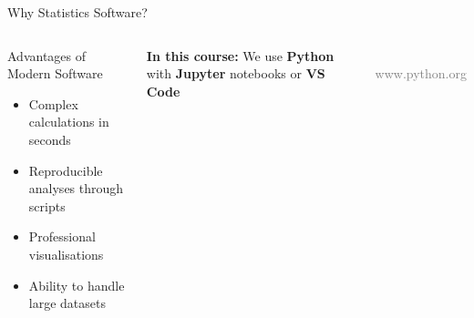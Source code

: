 \documentclass[aspectratio=169,11pt]{beamer}
\begin{document}
\begin{frame}{Why Statistics Software?}
  \begin{columns}[c]
    \begin{block}{Advantages of Modern Software}
      \begin{itemize}
        \item Complex calculations in seconds
        \item Reproducible analyses through scripts
        \item Professional visualisations
        \item Ability to handle large datasets
      \end{itemize}
    \end{block}
    \vspace{0.8em}
    \textbf{In this course:} We use \textbf{Python} with
    \textbf{Jupyter} notebooks or \textbf{VS Code}

    \begin{center}
      \\[0.5em]
      {\small\textcolor{gray}{www.python.org}}
    \end{center}
  \end{columns}
\end{frame}
\end{document}
